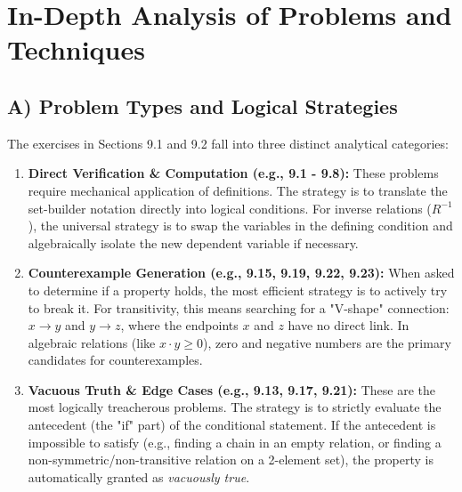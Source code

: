 \documentclass[11pt, a4paper]{article}
\theoremstyle{definition}
\theoremstyle{remark}
\begin{document}
\newpage

\section{In-Depth Analysis of Problems and Techniques}

\subsection{A) Problem Types and Logical Strategies}
The exercises in Sections 9.1 and 9.2 fall into three distinct analytical categories:
\begin{enumerate}
    \item \textbf{Direct Verification \& Computation (e.g., 9.1 - 9.8):} These problems require mechanical application of definitions. The strategy is to translate the set-builder notation directly into logical conditions. For inverse relations ($R^{-1}$), the universal strategy is to swap the variables in the defining condition and algebraically isolate the new dependent variable if necessary.
    \item \textbf{Counterexample Generation (e.g., 9.15, 9.19, 9.22, 9.23):} When asked to determine if a property holds, the most efficient strategy is to actively try to break it. For transitivity, this means searching for a "V-shape" connection: $x \to y$ and $y \to z$, where the endpoints $x$ and $z$ have no direct link. In algebraic relations (like $x \cdot y \ge 0$), zero and negative numbers are the primary candidates for counterexamples.
    \item \textbf{Vacuous Truth \& Edge Cases (e.g., 9.13, 9.17, 9.21):} These are the most logically treacherous problems. The strategy is to strictly evaluate the antecedent (the "if" part) of the conditional statement. If the antecedent is impossible to satisfy (e.g., finding a chain in an empty relation, or finding a non-symmetric/non-transitive relation on a 2-element set), the property is automatically granted as \textit{vacuously true}.
\end{enumerate}
\end{document}
